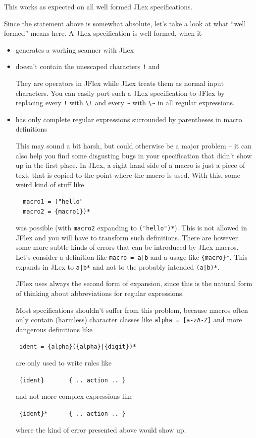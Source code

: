 \documentclass[11pt]{scrartcl}
\begin{document}
This works as expected on all well formed JLex specifications.

Since the statement above is somewhat absolute, let's take a look at
what ``well formed'' means here. A JLex specification is well formed, when
it
\begin{itemize}
\item
  generates a working scanner with JLex

\item 
  doesn't contain the unescaped characters \texttt{!} and \texttt{}

  They are operators in JFlex while JLex treats them as normal
  input characters. You can easily port such a JLex specification
  to JFlex by replacing every \texttt{!} with \verb+\!+ and every
  \verb+~+ with \verb+\~+ in all regular expressions.

\item
  has only complete regular expressions surrounded by parentheses in
  macro definitions
  
  This may sound a bit harsh, but could otherwise be a major problem
  -- it can also help you find some disgusting bugs in your
  specification that didn't show up in the first place. In JLex, a
  right hand side of a macro is just a piece of text, that is copied
  to the point where the macro is used. With this, some weird kind of
  stuff like
  \begin{verbatim}
  macro1 = ("hello"
  macro2 = {macro1})*
  \end{verbatim}  
  was possible (with \texttt{macro2} expanding to \verb+("hello")*+).  This
  is not allowed in JFlex and you will have to transform such
  definitions. There are however some more subtle kinds of errors that
  can be introduced by JLex macros. Let's consider a definition like
  \verb+macro = a|b+  and a usage like \verb+{macro}*+.
  This expands in JLex to \verb+a|b*+ and not to the probably intended
  \verb+(a|b)*+.

  JFlex uses always the second form of expansion, since this is the natural
  form of thinking about abbreviations for regular expressions.

  Most specifications shouldn't suffer from this problem, because
  macros often only contain (harmless) character classes like
  \texttt{alpha = [a-zA-Z]} and more dangerous definitions like

  \verb+ ident = {alpha}({alpha}|{digit})*+

  are only used to write rules like

  \verb+ {ident}       { .. action .. }+

  and not more complex expressions like

  \verb+ {ident}*      { .. action .. }+

  where the kind of error presented above would show up.
\end{itemize}
\end{document}
